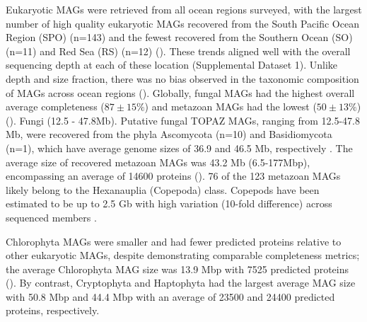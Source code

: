 \documentclass[12pt]{article}
\numberwithin{equation}{section}
\begin{document}
Eukaryotic MAGs were retrieved from all ocean regions surveyed, with the largest number of high quality eukaryotic MAGs recovered from the South Pacific Ocean Region (SPO) (n=143) and the fewest recovered from the Southern Ocean (SO) (n=11) and Red Sea (RS) (n=12) (). These trends aligned well with the overall sequencing depth at each of these location (Supplemental Dataset 1). Unlike depth and size fraction, there was no bias observed in the taxonomic composition of MAGs across ocean regions (). 
Globally, fungal MAGs had the highest overall average completeness ($87 \pm 15\%$) and metazoan MAGs had the lowest ($50 \pm 13\%$) (). Fungi (12.5 - 47.8Mb). Putative fungal TOPAZ MAGs, ranging from 12.5-47.8 Mb, were recovered from the phyla Ascomycota (n=10) and Basidiomycota (n=1), which have average genome sizes of 36.9 and 46.5 Mb, respectively \citep{Mohanta_2015}. The average size of recovered metazoan MAGs was 43.2 Mb (6.5-177Mbp), encompassing an average of 14600 proteins (). 76 of the 123 metazoan MAGs likely belong to the  Hexanauplia (Copepoda) class. Copepods have been estimated to be up to 2.5 Gb with high variation (10-fold difference) across sequenced members \citep{Jorgensen_2019}.  

Chlorophyta MAGs were smaller and had fewer predicted proteins relative to other eukaryotic MAGs, despite demonstrating comparable completeness metrics; the average Chlorophyta MAG size was 13.9 Mbp with 7525 predicted proteins (). By contrast, Cryptophyta and Haptophyta had the largest average MAG size with 50.8 Mbp and 44.4 Mbp with an average of 23500 and 24400 predicted proteins, respectively.
\end{document}
